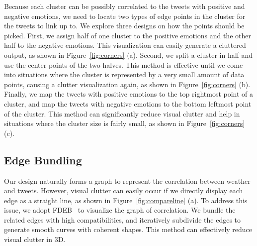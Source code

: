 Because each cluster can be possibly correlated to the tweets with positive and negative emotions, we need to locate two types of edge points in the cluster for the tweets to link up to. We explore three designs on how the points should be picked. First, we assign half of one cluster to the positive emotions and the other half to the negative emotions. This visualization can easily generate a cluttered output, as shown in Figure~\ref{fig:corners} (a). Second, we split a cluster in half and use the center points of the two halves. This method is effective until we come into situations where the cluster is represented by a very small amount of data points, causing a clutter visualization again, as shown in Figure~\ref{fig:corners} (b). Finally, we map the tweets with positive emotions to the top rightmost point of a cluster, and map the tweets with negative emotions to the bottom leftmost point of the cluster. This method can significantly reduce visual clutter and help in situations where the cluster size is fairly small, as shown in Figure~\ref{fig:corners} (c).





\subsection{Edge Bundling}
\label{sec:line}




Our design naturally forms a graph to represent the correlation between weather and tweets. However, visual clutter can easily occur if we directly display each edge as a straight line, as shown in Figure~\ref{fig:compareline} (a).
%
To address this issue, we adopt FDEB~\cite{holten2009force} to visualize the graph of correlation. We bundle the related edges with high compatibilities, and iteratively subdivide the edges to generate smooth curves with coherent shapes. This method can effectively reduce visual clutter in 3D.

